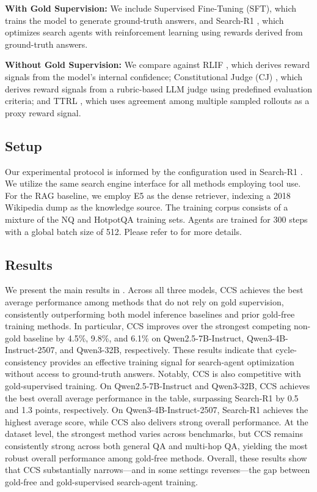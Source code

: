 \textbf{With Gold Supervision:} We include Supervised Fine-Tuning (SFT), which trains the model to generate ground-truth answers, and Search-R1 \citep{search-r1}, which optimizes search agents with reinforcement learning using rewards derived from ground-truth answers.

\textbf{Without Gold Supervision:} We compare against RLIF \citep{rlif}, which derives reward signals from the model's internal confidence; Constitutional Judge (CJ) \citep{geval}, which derives reward signals from a rubric-based LLM judge using predefined evaluation criteria; and TTRL \citep{ttrl}, which uses agreement among multiple sampled rollouts as a proxy reward signal.


\subsection{Setup} 
Our experimental protocol is informed by the configuration used in Search-R1 \citep{search-r1}. We utilize the same search engine interface for all methods employing tool use. For the RAG baseline, we employ E5 \citep{e5} as the dense retriever, indexing a 2018 Wikipedia dump \citep{wikidump} as the knowledge source. The training corpus consists of a mixture of the NQ and HotpotQA training sets. Agents are trained for 300 steps with a global batch size of 512. Please refer to  for more details.


\subsection{Results}
We present the main results in . Across all three models, CCS achieves the best average performance among methods that do not rely on gold supervision, consistently outperforming both model inference baselines and prior gold-free training methods. In particular, CCS improves over the strongest competing non-gold baseline by 4.5\%, 9.8\%, and 6.1\% on Qwen2.5-7B-Instruct, Qwen3-4B-Instruct-2507, and Qwen3-32B, respectively. These results indicate that cycle-consistency provides an effective training signal for search-agent optimization without access to ground-truth answers.
Notably, CCS is also competitive with gold-supervised training. On Qwen2.5-7B-Instruct and Qwen3-32B, CCS achieves the best overall average performance in the table, surpassing Search-R1 by 0.5 and 1.3 points, respectively. On Qwen3-4B-Instruct-2507, Search-R1 achieves the highest average score, while CCS also delivers strong overall performance. At the dataset level, the strongest method varies across benchmarks, but CCS remains consistently strong across both general QA and multi-hop QA, yielding the most robust overall performance among gold-free methods. Overall, these results show that CCS substantially narrows---and in some settings reverses---the gap between gold-free and gold-supervised search-agent training.